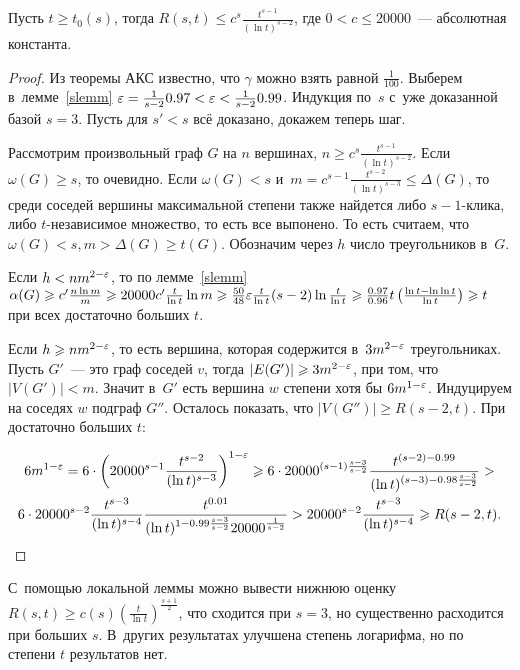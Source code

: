 \documentclass{article}
\begin{document}
\begin{theorem}
	Пусть $t \ge t_0(s)$, тогда $R(s, t) \le c^s \frac{t^{s-1}}{(\ln t)^{s-2}}$,
	где $0 < c \le 20000$~--- абсолютная константа.
\end{theorem}
\begin{proof}
	Из теоремы АКС известно, что $\gamma$ можно взять равной $\frac{1}{100}$.
	Выберем в~лемме~\ref{slemm} $\varepsilon = \frac{1}{s - 2} 0.97 < \varepsilon < \frac{1}{s -
	2} 0.99$. Индукция по~$s$ с~уже доказанной базой $s = 3$. Пусть для $s' < s$
	всё доказано, докажем теперь шаг.

	Рассмотрим произвольный граф $G$ на $n$ вершинах, $n \ge c^s
	\frac{t^{s-1}}{(\ln t)^{s-2}}$. Если $\omega(G) \ge s$, то очевидно.
	Если $\omega(G) < s$ и~$m = c^{s-1}\frac{t^{s-2}}{(\ln t)^{s-3}} \le
	\Delta(G)$, то среди соседей вершины максимальной степени также найдется либо
	$s - 1$-клика, либо $t$-независимое множество, то есть все выпонено. То есть
	считаем, что $\omega(G) < s, m > \Delta(G) \ge t(G)$.  Обозначим через $h$
	число треугольников в~$G$.

	Если $h < n m^{2-\varepsilon}$, то по лемме~\ref{slemm} $\alpha(G) \geqslant c' \frac{n \ln
	m}{m} \geqslant 20000c' \frac{t}{\ln t} \ln m \geqslant \frac{50}{48} \varepsilon \frac{t}{\ln t}
	(s - 2) \ln \frac{t}{\ln t} \geqslant \frac{0.97}{0.96} t \left( \frac{\ln t - \ln
	\ln t}{\ln t}\right) \geqslant t$ при всех достаточно больших $t$.

	Если $h \geqslant n m^{2 - \varepsilon}$, то есть вершина, которая содержится в~$3
	m^{2-\varepsilon}$ треугольниках. Пусть $G'$~--- это граф соседей $v$, тогда $|E(G')|
	\geqslant 3m^{2 - \varepsilon}$, при том, что $|V(G')| < m$. Значит в~$G'$ есть вершина $w$
	степени хотя бы $6 m^{1-\varepsilon}$. Индуцируем на соседях $w$ подграф $G''$.
	Осталось показать, что $|V(G'')| \ge R(s - 2, t)$. При достаточно больших $t$:

	\begin{multline*}
		6 m^{1-\varepsilon} = 6 \cdot \left( 20000^{s-1} \frac{t^{s-2}}{(\ln
		t)^{s-3}}\right)^{1-\varepsilon} \geqslant 6 \cdot 20000^{(s-1)\frac{s-3}{s-2}}
		\frac{t^{(s-2)-0.99}}{(\ln t)^{(s-3)-0.98\frac{s-3}{s-2}}}>\\
		6 \cdot 20000^{s-2} \frac{t^{s-3}}{(\ln t)^{s-4}} \frac{t^{0.01}}{(\ln t)^{1
		- 0.99 \frac{s-3}{s-2}} 20000^{\frac{1}{s-2}}} > 20000^{s-2}
		\frac{t^{s-3}}{(\ln t)^{s-4}} \geqslant R(s - 2, t).
	\end{multline*}
\end{proof}

С~помощью локальной леммы можно вывести нижнюю оценку $R(s, t) \ge c(s) \left(
\frac{t}{\ln t}\right)^\frac{s+1}{2}$, что сходится при $s = 3$, но существенно
расходится при больших $s$. В~других результатах улучшена степень логарифма, но
по степени $t$ результатов нет.
\end{document}
